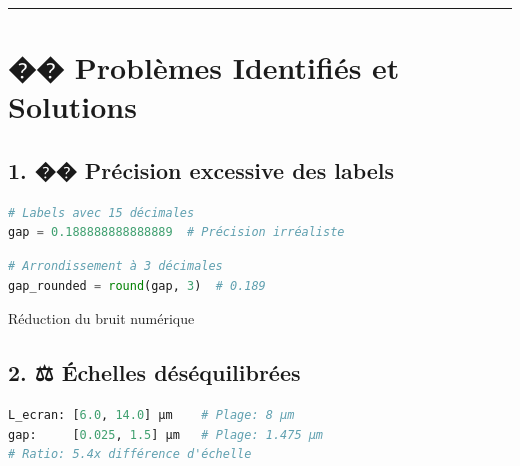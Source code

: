 \documentclass[a4paper,11pt]{article}
\begin{document}
\vspace{1em}
\hrule
\vspace{1em}

\section*{\large �� Problèmes Identifiés et Solutions}

\subsection*{1. �� Précision excessive des labels}

\begin{tcolorbox}[styleProblem,title={Problème}]
\begin{lstlisting}[language=Python]
# Labels avec 15 décimales
gap = 0.188888888888889  # Précision irréaliste
\end{lstlisting}
\end{tcolorbox}

\begin{tcolorbox}[styleSolution,title={Solution}]
\begin{lstlisting}[language=Python]
# Arrondissement à 3 décimales
gap_rounded = round(gap, 3)  # 0.189
\end{lstlisting}
\end{tcolorbox}

\begin{tcolorbox}[styleImpact,title={Impact}]
Réduction du bruit numérique
\end{tcolorbox}

\vspace{1em}

\subsection*{2. ⚖️ Échelles déséquilibrées}

\begin{tcolorbox}[styleProblem,title={Problème}]
\begin{lstlisting}[language=Python]
L_ecran: [6.0, 14.0] µm    # Plage: 8 µm
gap:     [0.025, 1.5] µm   # Plage: 1.475 µm
# Ratio: 5.4x différence d'échelle
\end{lstlisting}
\end{tcolorbox}
\end{document}
